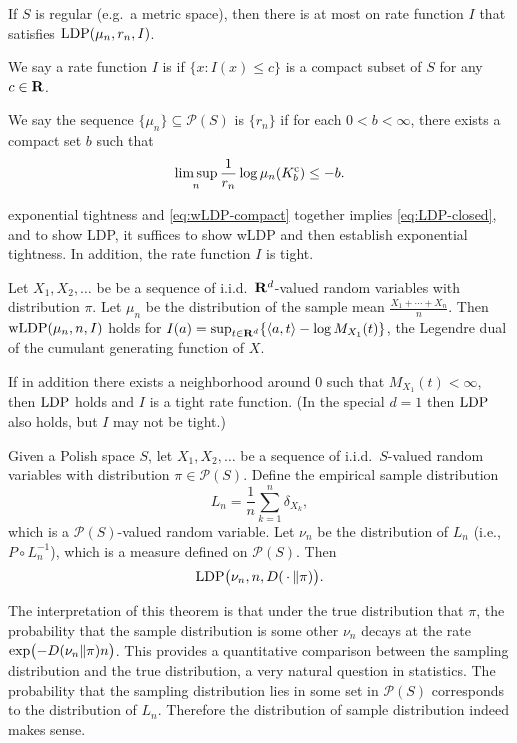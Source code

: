 If $S$ is regular (e.g.\ a metric space), then there is at most on rate function $I$ that satisfies $\operatorname{LDP}(\mu_n,r_n,I)$.

We say a rate function $I$ is  if $\{x : I(x) \leq c\}$ is a compact subset of $S$ for any $c \in \mathbf{R}$.

We say the sequence $\{\mu_n\} \subseteq \mathcal P(S)$ is  $\{r_n\}$ if for each $0 < b < \infty$, there exists a compact set $b$ such that \[
    \limsup_n \frac{1}{r_n} \log \mu_n(K_b^{\mathrm{c}}) \leq -b.
\]

exponential tightness and \eqref{eq:wLDP-compact} together implies \eqref{eq:LDP-closed}, and to show LDP, it suffices to show wLDP and then establish exponential tightness. In addition, the rate function $I$ is tight.

\begin{namedthm}
    Let $X_1,X_2,\dotsc$ be be a sequence of i.i.d.\ $\mathbf{R}^d$-valued random variables with distribution $\pi$. Let $\mu_n$ be the distribution of the sample mean $\frac{X_1+\dotsb+X_n}{n}$. Then $\operatorname{wLDP}(\mu_n,n,I)$ holds for $I(a) = \sup_{t\in \mathbf{R}^d}\{\langle a, t \rangle - \log M_{X_1}(t)\}$, the Legendre dual of the cumulant generating function of $X$.
    
    If in addition there exists a neighborhood around $0$ such that $M_{X_1}(t) < \infty$, then $\operatorname{LDP}$ holds and $I$ is a tight rate function. (In the special $d = 1$ then $\operatorname{LDP}$ also holds, but $I$ may not be tight.)
\end{namedthm}

\begin{namedthm}
    Given a Polish space $S$, let $X_1,X_2,\dotsc$ be a sequence of i.i.d.\ $S$-valued random variables with distribution $\pi \in \mathcal P(S)$. Define the empirical sample distribution \[
        L_n = \frac{1}{n}\sum_{k=1}^n \delta_{X_k},
    \] which is a $\mathcal P(S)$-valued random variable. Let $\nu_n$ be the distribution of $L_n$ (i.e., $P \circ L_n^{-1}$), which is a measure defined on $\mathcal P(S)$. Then \[\operatorname{LDP}\bigl(\nu_n,n,D(\,\cdot\,\Vert \pi)\bigr).\]
\end{namedthm}

The interpretation of this theorem is that under the true distribution that $\pi$, the probability that the sample distribution is some other $\nu_n$ decays at the rate $\exp\bigl(-D(\nu_n\Vert \pi)n\bigr)$. This provides a quantitative comparison between the sampling distribution and the true distribution, a very natural question in statistics. The probability that the sampling distribution lies in some set in $\mathcal P(S)$ corresponds to the distribution of $L_n$. Therefore the distribution of sample distribution indeed makes sense.

